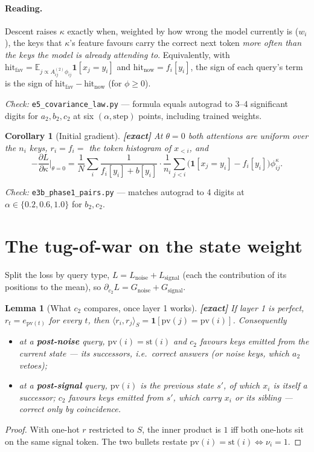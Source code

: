 \documentclass[11pt]{article}
\newtheorem{corollary}{Corollary}
\newtheorem{lemma}{Lemma}
\theoremstyle{definition}
\theoremstyle{remark}
\newcommand{\1}{\mathbf{1}}
\newcommand{\ip}[2]{\langle #1,#2\rangle_{S}}
\begin{document}
\paragraph{Reading.} Descent raises $\kappa$ exactly when, weighted by how wrong the model
currently is ($w_i$), the keys that $\kappa$'s feature favours carry the correct next token
\emph{more often than the keys the model is already attending to}. Equivalently, with
$\mathrm{hit}_{\mathrm{fav}}=\mathbb E_{j\propto A^{(2)}_{ij}\phi_{ij}}\1[x_j=y_i]$ and
$\mathrm{hit}_{\mathrm{now}}=f_i[y_i]$, the sign of each query's term is the sign of
$\mathrm{hit}_{\mathrm{fav}}-\mathrm{hit}_{\mathrm{now}}$ (for $\phi\ge0$).

\emph{Check:} \texttt{e5\_covariance\_law.py} --- formula equals autograd to 3--4 significant
digits for $a_2,b_2,c_2$ at six $(\alpha,\text{step})$ points, including trained weights.

\begin{corollary}[Initial gradient] \textbf{[exact]}
At $\theta=0$ both attentions are uniform over the $n_i$ keys, $r_i=f_i=$ the token histogram of
$x_{<i}$, and
\[
-\frac{\partial L}{\partial\kappa}\Big|_{\theta=0}
=\frac1N\sum_i\frac{1}{f_i[y_i]+b[y_i]}\cdot\frac1{n_i}\sum_{j<i}\big(\1[x_j=y_i]-f_i[y_i]\big)\phi^\kappa_{ij}.
\]
\end{corollary}
\emph{Check:} \texttt{e3b\_phase1\_pairs.py} --- matches autograd to 4 digits at
$\alpha\in\{0.2,0.6,1.0\}$ for $b_2,c_2$.

\section{The tug-of-war on the state weight}

Split the loss by query type, $L=L_{\mathrm{noise}}+L_{\mathrm{signal}}$ (each the contribution
of its positions to the mean), so $\partial_{c_2}L=G_{\mathrm{noise}}+G_{\mathrm{signal}}$.

\begin{lemma}[What $c_2$ compares, once layer 1 works] \textbf{[exact]}
If layer 1 is perfect, $r_t=e_{\mathrm{pv}(t)}$ for every $t$, then
$\ip{r_i}{r_j}=\1[\mathrm{pv}(j)=\mathrm{pv}(i)]$. Consequently
\begin{itemize}
\item at a \textbf{post-noise} query, $\mathrm{pv}(i)=\mathrm{st}(i)$ and $c_2$ favours keys
emitted from the \emph{current} state --- its successors, i.e.\ correct answers (or noise keys,
which $a_2$ vetoes);
\item at a \textbf{post-signal} query, $\mathrm{pv}(i)$ is the \emph{previous} state $s'$, of
which $x_i$ is itself a successor; $c_2$ favours keys emitted from $s'$, which carry $x_i$ or
its sibling --- correct only by coincidence.
\end{itemize}
\end{lemma}
\begin{proof}
With one-hot $r$ restricted to $S$, the inner product is $1$ iff both one-hots sit on the same
signal token. The two bullets restate $\mathrm{pv}(i)=\mathrm{st}(i)\iff\nu_i=1$.
\end{proof}
\end{document}

